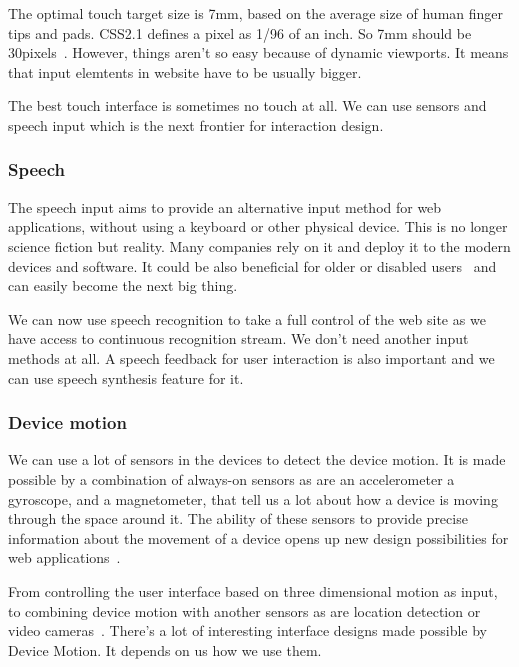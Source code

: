 \documentclass{iitsrc}
\begin{document}
The optimal touch target size is 7mm, based on the average size of human finger tips and pads. CSS2.1 defines a pixel as 1/96 of an inch. So 7mm should be 30pixels~\cite{designingfortouch}. However, things aren't so easy because of dynamic viewports. It means that input elemtents in website have to be usually bigger.

The best touch interface is sometimes no touch at all. We can use sensors and speech input which is the next frontier for interaction design.


\subsubsection*{Speech} %
\label{sub:speech}

The speech input aims to provide an alternative input method for web applications, without using a keyboard or other physical device. This is no longer science fiction but reality. Many companies rely on it and deploy it to the modern devices and software. It could be also beneficial for older or disabled users~\cite{SpeechRecognition} and can easily become the next big thing.

We can now use speech recognition to take a full control of the web site as we have access to continuous recognition stream. We don't need another input methods at all. A speech feedback for user interaction is also important and we can use speech synthesis feature for it.


\subsubsection*{Device motion} %
\label{sub:device_motion}

We can use a lot of sensors in the devices to detect the device motion. It is made possible by a combination of always-on sensors as are an accelerometer a gyroscope, and a magnetometer, that tell us a lot about how a device is moving through the space around it. The ability of these sensors to provide precise information about the movement of a device opens up new design possibilities for web applications~\cite{ultrabooks}.

From controlling the user interface based on three dimensional motion as input, to combining device motion with another sensors as are location detection or video cameras~\cite{AccelerationAndGyroscope}. There's a lot of interesting interface designs made possible by Device Motion. It depends on us how we use them.
\end{document}

